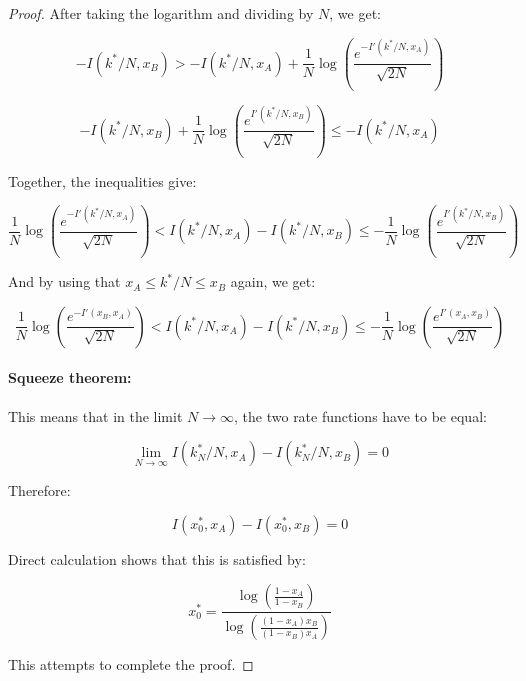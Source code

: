 \documentclass{article}
\theoremstyle{definition}
\begin{document}
\begin{proof}
    After taking the logarithm and dividing by $N$, we get:

    \begin{equation}
        -I(k^*/N,x_B) > -I(k^*/N,x_A) + \frac{1}{N} \log \left ( \frac{e^{-I'(k^*/N,x_A)}}{\sqrt{2 N}} \right )
    \end{equation}

    \begin{equation}
        -I(k^*/N,x_B)  + \frac{1}{N} \log \left ( \frac{e^{I'(k^*/N,x_B)}}{\sqrt{2 N}} \right )
        \le
         -I(k^*/N,x_A)
    \end{equation}

    Together, the inequalities give:

    \begin{equation}
        \frac{1}{N} \log \left ( \frac{e^{-I'(k^*/N,x_A)}}{\sqrt{2 N}} \right )
        <
        I(k^*/N,x_A) - I(k^*/N,x_B)
        \le
        - \frac{1}{N} \log \left ( \frac{e^{I'(k^*/N,x_B)}}{\sqrt{2 N}} \right )
    \end{equation}

    And by using that $x_A \le k^*/N \le x_B$ again, we get:

    \begin{equation}
        \frac{1}{N} \log \left ( \frac{e^{-I'(x_B,x_A)}}{\sqrt{2 N}} \right )
        <
        I(k^*/N,x_A) - I(k^*/N,x_B)
        \le
        - \frac{1}{N} \log \left ( \frac{e^{I'(x_A,x_B)}}{\sqrt{2 N}} \right )
    \end{equation}

    \paragraph{Squeeze theorem:}
    This means that in the limit $N \to \infty$, the two rate functions have to be equal:

    \begin{equation}
        \lim_{N \to \infty} I(k^*_N/N,x_A) - I(k^*_N/N,x_B) = 0
    \end{equation}

    Therefore:

    \begin{equation}
        I(x_0^*,x_A) - I(x_0^*,x_B) = 0
    \end{equation}

    Direct calculation shows that this is satisfied by:

    \begin{equation}
    \label{eq:Fisherx0*}
        x_0^* = \frac{\log \left ( \frac{1-x_A}{1-x_B} \right )}{\log \left ( \frac{(1-x_A) x_B}{(1-x_B) x_A} \right )}
    \end{equation}

    This attempts to complete the proof.
    
\end{proof}
\end{document}
